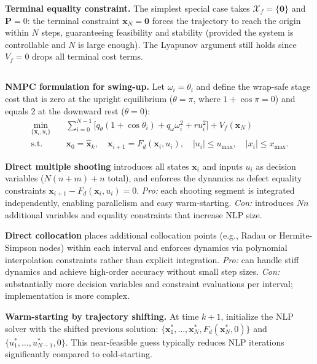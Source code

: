 \textbf{Terminal equality constraint.} The simplest special case takes $\mathcal{X}_f = \{\mathbf{0}\}$ and $\mathbf{P} = 0$: the terminal constraint $\mathbf{x}_N = \mathbf{0}$ forces the trajectory to reach the origin within $N$ steps, guaranteeing feasibility and stability (provided the system is controllable and $N$ is large enough). The Lyapunov argument still holds since $V_f = 0$ drops all terminal cost terms.

\subsection{}
\textbf{NMPC formulation for swing-up.} Let $\omega_i = \dot\theta_i$ and define the wrap-safe stage cost that is zero at the upright equilibrium ($\theta = \pi$, where $1 + \cos\pi = 0$) and equals 2 at the downward rest ($\theta = 0$):
\begin{equation}
\begin{aligned}
    \min_{\{\mathbf{x}_i, u_i\}} \quad & \sum_{i=0}^{N-1}\bigl[q_\theta(1+\cos\theta_i) + q_\omega\omega_i^2 + ru_i^2\bigr] + V_f(\mathbf{x}_N) \\
    \text{s.t.} \quad & \mathbf{x}_0 = \hat{\mathbf{x}}_k,\quad \mathbf{x}_{i+1} = F_d(\mathbf{x}_i, u_i),\quad |u_i| \leq u_{\max},\quad |x_i| \leq x_{\max}.
\end{aligned}
\end{equation}

\textbf{Direct multiple shooting} introduces all states $\mathbf{x}_i$ and inputs $u_i$ as decision variables ($N(n+m)+n$ total), and enforces the dynamics as defect equality constraints $\mathbf{x}_{i+1} - F_d(\mathbf{x}_i, u_i) = 0$. \textit{Pro:} each shooting segment is integrated independently, enabling parallelism and easy warm-starting. \textit{Con:} introduces $Nn$ additional variables and equality constraints that increase NLP size.

\textbf{Direct collocation} places additional collocation points (e.g., Radau or Hermite-Simpson nodes) within each interval and enforces dynamics via polynomial interpolation constraints rather than explicit integration. \textit{Pro:} can handle stiff dynamics and achieve high-order accuracy without small step sizes. \textit{Con:} substantially more decision variables and constraint evaluations per interval; implementation is more complex.

\textbf{Warm-starting by trajectory shifting.} At time $k+1$, initialize the NLP solver with the shifted previous solution: $\{\mathbf{x}_1^*, \ldots, \mathbf{x}_N^*, F_d(\mathbf{x}_N^*, 0)\}$ and $\{u_1^*, \ldots, u_{N-1}^*, 0\}$. This near-feasible guess typically reduces NLP iterations significantly compared to cold-starting.

